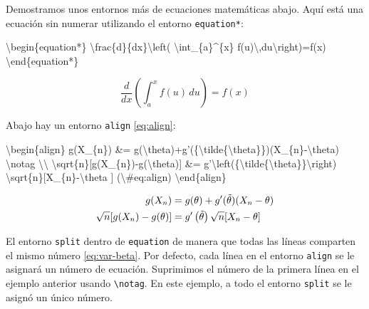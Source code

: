 \documentclass[12pt,]{krantz}
\makeatletter
\newenvironment{Shaded}{\begin{snugshade}}{\end{snugshade}}
\newcommand{\NormalTok}[1]{{#1}}
\newenvironment{kframe}{%
\medskip{}
\setlength{\fboxsep}{.8em}
 \def\at@end@of@kframe{}%
 \ifinner\ifhmode%
  \def\at@end@of@kframe{\end{minipage}}%
  \begin{minipage}{\columnwidth}%
 \fi\fi%
 \def\FrameCommand##1{\hskip\@totalleftmargin \hskip-\fboxsep
 \colorbox{shadecolor}{##1}\hskip-\fboxsep
     \hskip-\linewidth \hskip-\@totalleftmargin \hskip\columnwidth}%
 \MakeFramed {\advance\hsize-\width
   \@totalleftmargin\z@ \linewidth\hsize
   \@setminipage}}%
 {\par\unskip\endMakeFramed%
 \at@end@of@kframe}
\renewenvironment{Shaded}{\begin{kframe}}{\end{kframe}}
\theoremstyle{definition}
\theoremstyle{definition}
\theoremstyle{remark}
\makeatother
\begin{document}
Demostramos unos entornos más de ecuaciones matemáticas abajo. Aquí está
una ecuación sin numerar utilizando el entorno \texttt{equation*}:

\begin{Shaded}
\begin{Highlighting}[]
\NormalTok{\textbackslash{}begin\{equation*\} }
\NormalTok{\textbackslash{}frac\{d\}\{dx\}\textbackslash{}left( \textbackslash{}int_\{a\}^\{x\} f(u)\textbackslash{},du\textbackslash{}right)=f(x)}
\NormalTok{\textbackslash{}end\{equation*\} }
\end{Highlighting}
\end{Shaded}

\begin{equation*}
\frac{d}{dx}\left( \int_{a}^{x} f(u)\,du\right)=f(x)
\end{equation*}

Abajo hay un entorno \texttt{align} \eqref{eq:align}:

\begin{Shaded}
\begin{Highlighting}[]
\NormalTok{\textbackslash{}begin\{align\} }
\NormalTok{g(X_\{n\}) &= g(\textbackslash{}theta)+g'(\{\textbackslash{}tilde\{\textbackslash{}theta\}\})(X_\{n\}-\textbackslash{}theta) \textbackslash{}notag \textbackslash{}\textbackslash{}}
\NormalTok{\textbackslash{}sqrt\{n\}[g(X_\{n\})-g(\textbackslash{}theta)] &= g'\textbackslash{}left(\{\textbackslash{}tilde\{\textbackslash{}theta\}\}\textbackslash{}right)}
  \NormalTok{\textbackslash{}sqrt\{n\}[X_\{n\}-\textbackslash{}theta ] (\textbackslash{}#eq:align)}
\NormalTok{\textbackslash{}end\{align\} }
\end{Highlighting}
\end{Shaded}

\begin{align}
g(X_{n}) &= g(\theta)+g'({\tilde{\theta}})(X_{n}-\theta) \notag \\
\sqrt{n}[g(X_{n})-g(\theta)] &= g'\left({\tilde{\theta}}\right)
  \sqrt{n}[X_{n}-\theta ] \label{eq:align}
\end{align}

El entorno \texttt{split} dentro de \texttt{equation} de manera que
todas las líneas comparten el mismo número \eqref{eq:var-beta}. Por
defecto, cada línea en el entorno \texttt{align} se le asignará un
número de ecuación. Suprimimos el número de la primera línea en el
ejemplo anterior usando \texttt{\textbackslash{}notag}. En este ejemplo,
a todo el entorno \texttt{split} se le asignó un único número.
\end{document}
